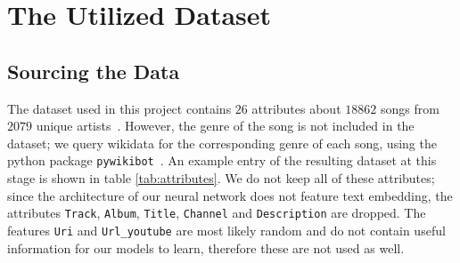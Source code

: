 \documentclass[
  12pt,
  bibliography=totoc,     %
  captions=tableheading,  %
  titlepage=firstiscover, %
]{scrartcl}
\begin{document}
\section{The Utilized Dataset}
\subsection{Sourcing the Data}
The dataset used in this project contains $26$ attributes about $18862$ songs from $2079$ unique artists~\cite{Datensatz}.
However, the genre of the song is not included in the dataset; we query wikidata for the corresponding genre of each song,
using the python package \texttt{pywikibot}~\cite{pywikibot}. An example entry of the resulting dataset at this stage
is shown in table \ref{tab:attributes}. We do not keep all of these attributes; since the architecture of our
neural network does not feature text embedding, the attributes \texttt{Track}, \texttt{Album}, \texttt{Title}, \texttt{Channel} and
\texttt{Description} are dropped. The features \texttt{Uri} and \texttt{Url\_youtube} are most likely random and do not contain
useful information for our models to learn, therefore these are not used as well.
\FloatBarrier
\end{document}
